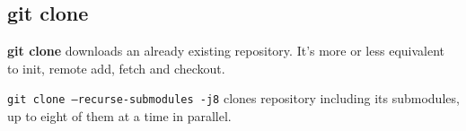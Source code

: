 %

\subsection{git clone}
\textbf{git clone} downloads an already existing repository.
It's more or less equivalent to init, remote add, fetch and checkout.

\texttt{git clone --recurse-submodules -j8} clones repository including its submodules, up to eight of them at a time in parallel.

%